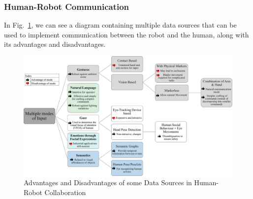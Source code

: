 \subsubsection{Human-Robot Communication}

In Fig.~\ref{interaction}, we can see a diagram containing multiple data sources that can be used to implement communication between the robot and the human, along with its advantages and disadvantages.

\begin{figure}[H]
\centerline{\includegraphics[width=6in]{figs/interaction.PNG}}
\caption{Advantages and Disadvantages of some Data Sources in Human-Robot Collaboration \cite{Mukherjee2022}}
\label{interaction}
\end{figure}

